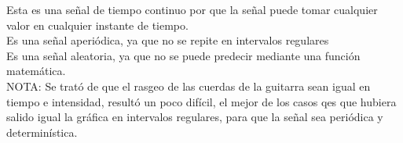 \documentclass[10pt,a4paper]{report}
\begin{document}
\begin{itemize}
Esta es una señal de tiempo continuo por que la señal puede tomar cualquier valor en cualquier instante de tiempo. \\
Es una señal aperiódica, ya que no se repite en intervalos regulares \\
Es una señal aleatoria, ya que no se puede predecir mediante una función matemática.\\
NOTA: Se trató de que el rasgeo de las cuerdas de la guitarra sean igual en tiempo e intensidad, resultó un poco difícil, el mejor de los casos qes que hubiera salido igual la gráfica en intervalos regulares, para que la señal sea periódica y determinística. 

\end{itemize}
\end{document}
